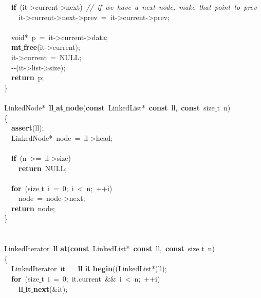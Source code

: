 \documentclass{article}
\begin{document}
\mbox{}\ \ \textbf{if}\ (it-\textgreater{}current-\textgreater{}next)\ \textit{//\ if\ we\ have\ a\ next\ node,\ make\ that\ point\ to\ prev} \\
\mbox{}\ \ \ \ it-\textgreater{}current-\textgreater{}next-\textgreater{}prev\ =\ it-\textgreater{}current-\textgreater{}prev; \\
\mbox{} \\
\mbox{}\ \ void*\ p\ =\ it-\textgreater{}current-\textgreater{}data; \\
\mbox{}\ \ \textbf{mt$\_$free}(it-\textgreater{}current); \\
\mbox{}\ \ it-\textgreater{}current\ =\ NULL; \\
\mbox{}\ \ -\/-(it-\textgreater{}list-\textgreater{}size); \\
\mbox{}\ \ \textbf{return}\ p; \\
\mbox{}\} \\
\mbox{} \\
\mbox{}LinkedNode*\ \textbf{ll$\_$at$\_$node}(\textbf{const}\ LinkedList*\ \textbf{const}\ ll,\ \textbf{const}\ size$\_$t\ n) \\
\mbox{}\{ \\
\mbox{}\ \ \textbf{assert}(ll); \\
\mbox{}\ \ LinkedNode*\ node\ =\ ll-\textgreater{}head; \\
\mbox{} \\
\mbox{}\ \ \textbf{if}\ (n\ \textgreater{}=\ ll-\textgreater{}size) \\
\mbox{}\ \ \ \ \textbf{return}\ NULL; \\
\mbox{} \\
\mbox{}\ \ \textbf{for}\ (size$\_$t\ i\ =\ 0;\ i\ \textless{}\ n;\ ++i) \\
\mbox{}\ \ \ \ node\ =\ node-\textgreater{}next; \\
\mbox{}\ \ \textbf{return}\ node; \\
\mbox{}\} \\
\mbox{} \\
\mbox{} \\
\mbox{}LinkedIterator\ \textbf{ll$\_$at}(\textbf{const}\ LinkedList*\ \textbf{const}\ ll,\ \textbf{const}\ size$\_$t\ n) \\
\mbox{}\{ \\
\mbox{}\ \ LinkedIterator\ it\ =\ \textbf{ll$\_$it$\_$begin}((LinkedList*)ll); \\
\mbox{}\ \ \textbf{for}\ (size$\_$t\ i\ =\ 0;\ it.current\ \&\&\ i\ \textless{}\ n;\ ++i) \\
\mbox{}\ \ \ \ \textbf{ll$\_$it$\_$next}(\&it); \\
\end{document}
